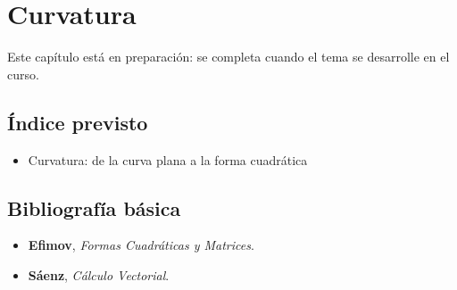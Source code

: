 \chapter{Curvatura}\label{cap:curvatura}

Este capítulo está en preparación: se completa cuando el tema se desarrolle en el curso.

\section*{Índice previsto}

\begin{itemize}
  \item Curvatura: de la curva plana a la forma cuadrática
\end{itemize}

\section*{Bibliografía básica}

\begin{itemize}
  \item \textbf{Efimov}, \emph{Formas Cuadráticas y Matrices}.
  \item \textbf{Sáenz}, \emph{Cálculo Vectorial}.
\end{itemize}
